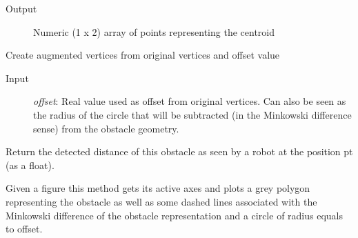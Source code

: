 \documentclass[letterpaper,10pt,english]{sphinxmanual}
\begin{document}
\begin{fulllineitems}
\begin{fulllineitems}
\begin{description}
\item[{Output}] \leavevmode
Numeric (1 x 2) array of points representing the centroid

\end{description}

\end{fulllineitems}


\begin{fulllineitems}
\label{Multi-robot motion planner:planning_sim.PolygonObstacle._create_aug_vertices}
Create augmented vertices from original vertices and offset value
\begin{description}
\item[{Input}] \leavevmode
\emph{offset}: Real value used as offset from original vertices. Can also
be seen as the radius of the circle that will be subtracted (in the
Minkowski difference sense) from the obstacle geometry.

\end{description}

\end{fulllineitems}


\begin{fulllineitems}
\label{Multi-robot motion planner:planning_sim.PolygonObstacle.detected_dist}
Return the detected distance of this obstacle as seen by a robot at the position pt
(as a float).

\end{fulllineitems}


\begin{fulllineitems}
\label{Multi-robot motion planner:planning_sim.PolygonObstacle.plot}
Given a figure this method gets its active axes and plots a grey polygon representing
the obstacle as well as some dashed lines associated with the Minkowski difference of
the obstacle representation and a circle of radius equals to offset.

\end{fulllineitems}



\end{fulllineitems}
\end{document}
